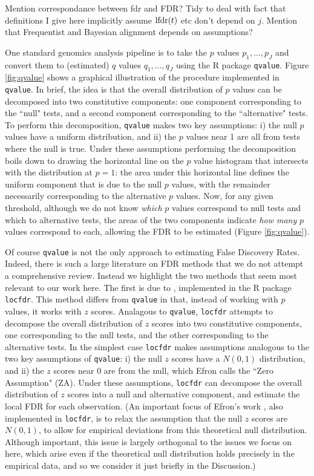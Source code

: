 \documentclass[11pt]{article}
\def\qvalue{{\tt qvalue}\xspace}
\def\locfdr{{\tt locfdr}\xspace}
\begin{document}
Mention correspondance between fdr and FDR?
Tidy to deal with fact that definitions I give here implicitly assume $\text{lfdr}(t)$ etc don't depend on $j$.
Mention that Frequentist and Bayesian alignment depends on assumptions?

One standard genomics analysis pipeline is to take the $p$ values $p_1,\dots,p_J$ and convert them to (estimated) $q$ values $q_1,\dots,q_J$
 using the R package \qvalue. Figure \ref{fig:qvalue} shows a graphical illustration of the procedure implemented in \qvalue. 
 In brief, the idea is that the overall distribution of $p$ values can be decomposed into two constitutive
 components: one component corresponding to the ``null" tests, and a second component corresponding to the ``alternative" tests. 
To perform this decomposition, \qvalue makes two key assumptions:
  i) the null $p$ values have a uniform distribution, and ii) the $p$ values near 1 are all from
 tests where the null is true. Under these assumptions performing the decomposition boils down to 
 drawing the horizontal line on the $p$ value histogram that intersects with the distribution at $p=1$: the area under this horizontal
 line defines the uniform component that is due to the null $p$ values, with the remainder necessarily corresponding to
 the alternative $p$ values. Now, for any given threshold, although we do not know {\it which} $p$ values correspond
 to  null tests  and which to alternative tests, the areas of the two components indicate {\it how many} $p$ values correspond to each,
 allowing the FDR to be estimated (Figure \ref{fig:qvalue}).
 
 Of course \qvalue is not the only approach to estimating False Discovery Rates. Indeed, there is such a large
 literature on FDR methods that we do not attempt a comprehensive review. Instead we highlight the two methods that
 seem most relevant to our work here. The first is due to \cite{efron.xx}, implemented in the R package \locfdr.
 This method differs from \qvalue in that, instead of working with $p$ values, it works with $z$ scores.
 Analagous to \qvalue, \locfdr attempts to decompose the overall distribution of $z$ scores into two constitutive components,
 one corresponding to the null tests, and the other corresponding to the alternative tests. 
 In the simplest case
 \locfdr  makes assumptions analogous to the two key assumptions of \qvalue: i) the null $z$ scores have a $N(0,1)$ distribution,
 and ii) the $z$ scores near 0 are from the null, which Efron
calls the ``Zero Assumption" (ZA). Under these assumptions, \locfdr can decompose the
overall distribution of $z$ scores into a null and alternative component, and estimate the local FDR for each observation. 
 (An important focus of Efron's work \cite{}, also implemented in \locfdr, 
 is to relax the assumption that the null $z$ scores are $N(0,1)$, to allow for empirical deviations from this
theoretical null distribution. Although important, this issue is largely orthogonal to the issues we focus on here, which arise
even if the theoretical null distribution holds precisely in the empirical data, and so we consider it just briefly in the Discussion.) 
\end{document}
